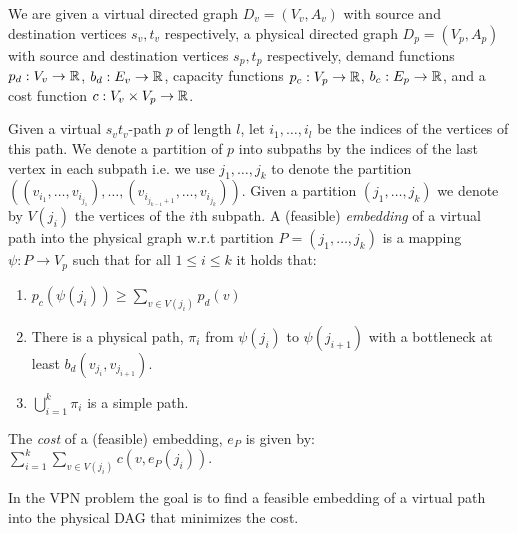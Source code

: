 We are given a virtual directed graph $D_v = (V_v, A_v)$ 
with source and destination vertices $s_v, t_v$ respectively, 
a physical directed graph $D_p = (V_p, A_p)$
with source and destination vertices $s_p, t_p$ respectively,
demand functions $p_d : V_v \to \mathbb{R}$, $b_d : E_v \to \mathbb{R}$,
capacity functions $p_c : V_p \to \mathbb{R}$, $b_c : E_p \to \mathbb{R}$,
and a cost function $c: V_v \times V_p \to \mathbb{R}$. 

Given a virtual $s_vt_v$-path $p$ of length $l$,
let $i_1, \ldots, i_l$ be the indices of the vertices of this path.
We denote a partition of $p$ into subpaths by the indices of the last vertex in
each subpath i.e. we use $j_1, \ldots, j_k$ to denote the partition 
$((v_{i_1}, \ldots, v_{i_{j_1}}), \ldots, (v_{i_{j_{k-1} + 1}}, \ldots,
v_{i_{j_k}}))$.
Given a partition $(j_1, \ldots, j_k)$ we denote by $V(j_i)$ the vertices of the
$i$th subpath.
A (feasible) \emph{embedding} of a virtual path into the physical graph 
w.r.t partition $P = (j_1, \ldots,j_k)$ is a mapping $\psi : P \to V_p$ such that
for all $1 \leq i \leq k$ it holds that:
\begin{enumerate}
  \item $p_c(\psi(j_i)) \geq \sum_{v \in V(j_i)} p_d(v)$
  \item There is a physical path, $\pi_i$ from $\psi(j_i)$ to $\psi(j_{i+1})$ with a
  bottleneck at least $b_d(v_{j_i}, v_{j_{i+1}})$.
  \item $\bigcup_{i = 1}^k \pi_i$ is a simple path.
\end{enumerate}
The \emph{cost} of a (feasible) embedding, $e_P$ is given by:
$\sum_{i = 1}^k \sum_{v \in V(j_i)} c(v, e_P(j_i))$.   

In the  VPN problem the goal is to find a
feasible embedding of a virtual path into the physical DAG that minimizes the
cost.

\begin{figure}[ht]
\centering
\scalebox{1}{

}

\end{figure}
